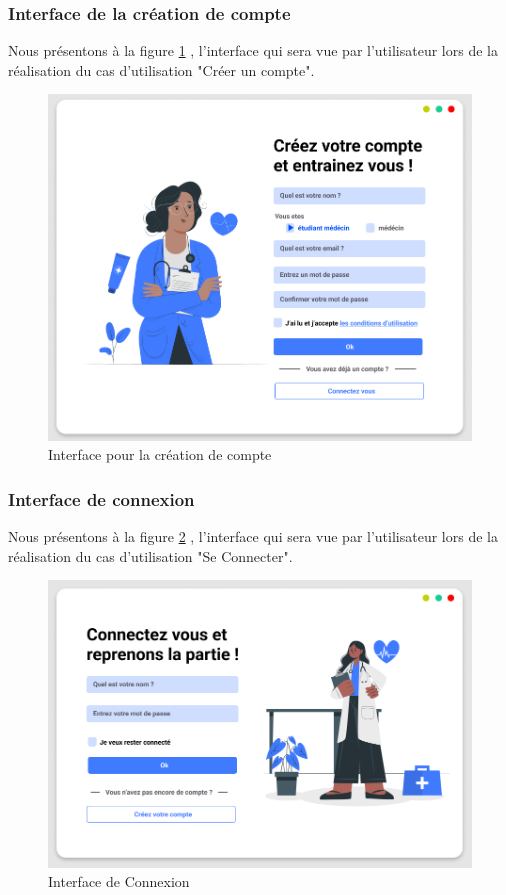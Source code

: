 \subsubsection{Interface de la création de compte}
Nous présentons à la figure \ref{fig:in_compte}  , l'interface qui sera vue par l'utilisateur lors de la réalisation du cas d'utilisation "Créer un compte".
\begin{figure}[H]
    \centering
    \includegraphics[width=\textwidth]{figures/signup.png}
    \captionsetup{justification=centering}
    \caption{Interface pour la création de compte}
    \label{fig:in_compte}
\end{figure}

\subsubsection{Interface de connexion}
Nous présentons à la figure \ref{fig:in_connection}  , l'interface qui sera vue par l'utilisateur lors de la réalisation du cas d'utilisation "Se Connecter".
\begin{figure}[H]
    \centering
    \includegraphics[width=\textwidth]{figures/signin.png}
    \captionsetup{justification=centering}
    \caption{Interface de Connexion}
    \label{fig:in_connection}
\end{figure}

